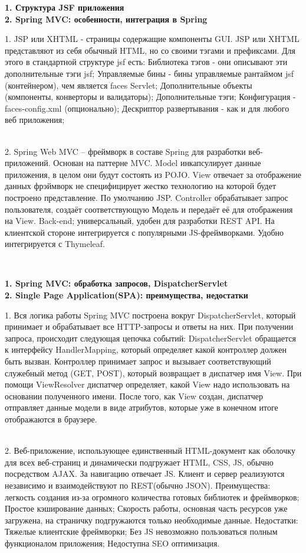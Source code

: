 \documentclass{article}
\newcommand{\bil}[4]{%
    \begin{minipage}{.3\textwidth}
        \textbf{1. #1} \\
        \textbf{2. #2}

        1. #3
        \\
        2. #4
    \end{minipage}
}
\begin{document}
\hfill
\bil{Структура JSF приложения}{Spring MVC: особенности, интеграция в Spring}{
    JSP или XHTML - страницы содержащие компоненты GUI. JSP или XHTML представляют из себя обычный HTML, но со своими тэгами и префиксами.
Для этого в стандартной структуре jsf есть:
Библиотека тэгов - они описывают эти дополнительные тэги jsf;
Управляемые бины - бины управляемые рантаймом jsf (контейнером), чем является faces Servlet;
Дополнительные объекты (компоненты, конверторы и валидаторы);
Дополнительные тэги;
Конфигурация - faces-config.xml (опционально);
Дескриптор развертывания - как и для любого веб приложения;
}{
    Spring Web MVC – фреймворк в составе Spring для разработки веб-приложений.
    Основан на паттерне MVC.
    Model инкапсулирует данные приложения, в целом они будут состоять из POJO.
    View отвечает за отображение данных фрэймворк не специфицирует жестко технологию на которой будет построено представление. По умолчанию JSP.
    Controller обрабатывает запрос пользователя, создаёт соответствующую Модель и передаёт её для отображения на View.
Back-end; универсальный, удобен для разработки REST API. На клиентской стороне интегрируется с популярными JS-фреймворками.
Удобно интегрируется с Thymeleaf.

}
\\
\bil{Spring MVC: обработка запросов, DispatcherServlet}{Single Page Application(SPA): преимущества, недостатки}{
    Вся логика работы Spring MVC построена вокруг DispatcherServlet, который принимает и обрабатывает все HTTP-запросы и ответы на них. При получении запроса, происходит следующая цепочка событий: 
DispatcherServlet обращается к интерфейсу HandlerMapping, который определяет какой контроллер должен быть вызван. 
Контроллер принимает запрос и вызывает соответствующий служебный метод (GET, POST), который возвращает в диспатчер имя View.
При помощи ViewResolver диспатчер определяет, какой View надо использовать на основании полученного имени.
После того, как View создан, диспатчер отправляет данные модели в виде атрибутов, которые уже в конечном итоге отображаются в браузере.
}{
    Веб-приложение, использующее единственный HTML-документ как оболочку для всех веб-страниц и динамически подгружает HTML, CSS, JS, обычно посредством AJAX. За навигацию отвечает JS.
    Клиент и сервер реализуются независимо и взаимодействуют по REST(обычно JSON). 
    Преимущества: легкость создания из-за огромного количества готовых библиотек и фреймворков;
    Простое кэширование данных;
    Скорость работы, основная часть ресурсов уже загружена, на страничку подгружаются только необходимые данные.
    Недостатки: 
    Тяжелые клиентские фреймворки;
    Без JS невозможно пользоваться полным функционалом приложения;
    Недоступна SEO оптимизация.
}
\end{document}
